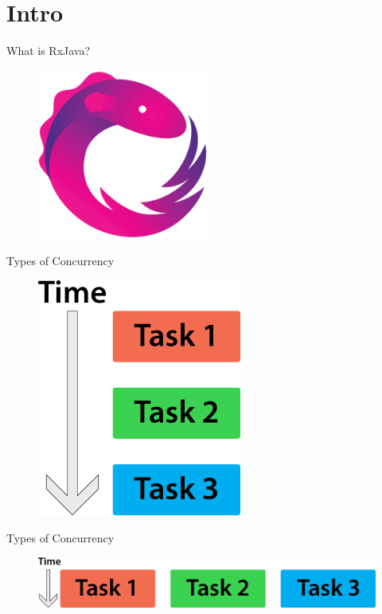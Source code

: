 \section{Intro}\label{sec:intro}

\begin{frame}{What is RxJava?}
	\begin{figure}[h]
		\includegraphics[width=0.5\textwidth,page=1]{gfx/rx_logo}
	\end{figure}
\end{frame}

\begin{frame}{Types of Concurrency}
	\begin{figure}[h]
		\includegraphics[width=0.6\textwidth,page=1]{gfx/single_threaded_nowait}
	\end{figure}
\end{frame}

\begin{frame}{Types of Concurrency}
	\begin{figure}[h]
		\includegraphics[width=1.0\textwidth,page=1]{gfx/multi_threaded}
	\end{figure}
\end{frame}

